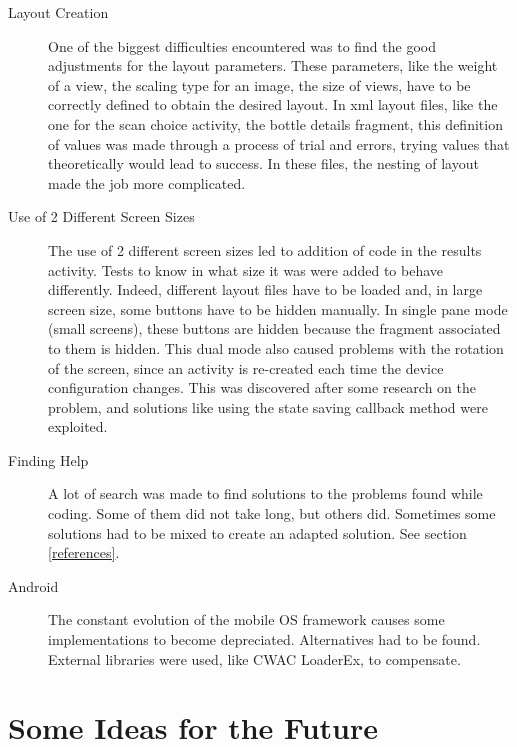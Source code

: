 \begin{description}

	\item[Layout Creation] One of the biggest difficulties encountered was to find the good adjustments for the layout parameters. These parameters, like the weight of a view, the scaling type for an image, the size of views, have to be correctly defined to obtain the desired layout. In xml layout files, like the one for the scan choice activity, the bottle details fragment, this definition of values was made through a process of trial and errors, trying values that theoretically would lead to success. In these files, the nesting of layout made the job more complicated.
	
	\item[Use of 2 Different Screen Sizes] The use of 2 different screen sizes led to addition of code in the results activity. Tests to know in what size it was were added to behave differently. Indeed, different layout files have to be loaded and, in large screen size, some buttons have to be hidden manually. In single pane mode (small screens), these buttons are hidden because the fragment associated to them is hidden. This dual mode also caused problems with the rotation of the screen, since an activity is re-created each time the device configuration changes. This was discovered after some research on the problem, and solutions like using the state saving callback method were exploited.
	
	\item[Finding Help] A lot of search was made to find solutions to the problems found while coding. Some of them did not take long, but others did. Sometimes some solutions had to be mixed to create an adapted solution. See section \ref{references}.
	
	\item[Android] The constant evolution of the mobile OS framework causes some implementations to become depreciated. Alternatives had to be found. External libraries were used, like CWAC LoaderEx, to compensate.
\end{description}


\section{Some Ideas for the Future}

